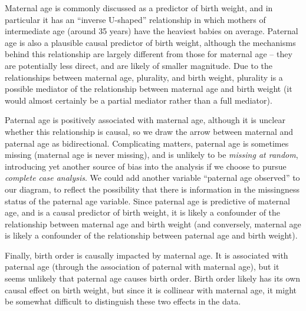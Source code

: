 Maternal age is commonly discussed as a predictor of birth weight, and in particular it has an ``inverse U-shaped'' relationship in which mothers of intermediate age (around 35 years) have the heaviest babies on average.  Paternal age is also a plausible causal predictor of birth weight, although the mechanisms behind this relationship are largely different from those for maternal age -- they are potentially less direct, and are likely of smaller magnitude.  Due to the relationships between maternal age, plurality, and birth weight, plurality is a possible mediator of the relationship between maternal age and birth weight (it would almost certainly be a partial mediator rather than a full mediator).

Paternal age is positively associated with maternal age, although it is unclear whether this relationship is causal, so we draw the arrow between maternal and paternal age as bidirectional.  Complicating matters, paternal age is sometimes missing (maternal age is never missing), and is unlikely to be {\em missing at random}, introducing yet another source of bias into the analysis if we choose to pursue {\em complete case analysis}.  We could add another variable ``paternal age observed'' to our diagram, to reflect the possibility that there is information in the missingness status of the paternal age variable. Since paternal age is predictive of maternal age, and is a causal predictor of birth weight, it is likely a confounder of the relationship between maternal age and birth weight (and conversely, maternal age is likely a confounder of the relationship between paternal age and birth weight).

Finally, birth order is causally impacted by maternal age.  It is associated with paternal age (through the association of paternal with maternal age), but it seems unlikely that paternal age causes birth order.  Birth order likely has its own causal effect on birth weight, but since it is collinear with maternal age, it might be somewhat difficult to distinguish these two effects in the data.

